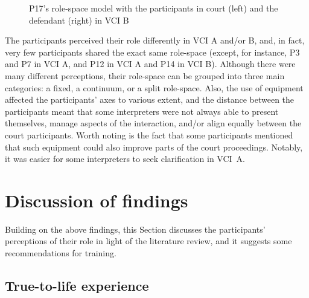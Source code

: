 \documentclass[output=paper]{langsci/langscibook}
\begin{document}
\begin{figure}
  
   
\caption{\label{fig:devaux:15}P17's role-space model with the participants in court (left) and the defendant (right) in \textsc{VCI} B}
\end{figure}

The participants perceived their role differently in \textsc{VCI} A and/or B, and, in fact, very few participants shared the exact same role-space (except, for instance, P3 and P7 in \textsc{VCI} A, and P12 in \textsc{VCI} A and P14 in \textsc{VCI} B). Although there were many different perceptions, their role-space can be grouped into three main categories: a fixed, a continuum, or a split role-space. Also, the use of equipment affected the participants’ axes to various extent, and the distance between the participants meant that some interpreters were not always able to present themselves, manage aspects of the interaction, and/or align equally between the court participants. Worth noting is the fact that some participants mentioned that such equipment could also improve parts of the court proceedings. Notably, it was easier for some interpreters to seek clarification in \textsc{VCI}~A. 

\section{Discussion of findings}

Building on the above findings, this Section discusses the participants’ perceptions of their role in light of the literature review, and it suggests some recommendations for training.

\subsection{True-to-life experience}
\end{document}
